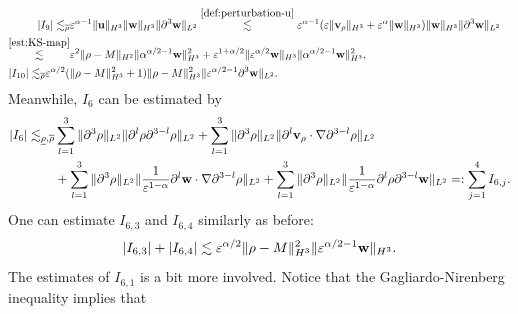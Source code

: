 \documentclass[11pt]{article}
\theoremstyle{plain}
\theoremstyle{definition}
\theoremstyle{remark}
\renewcommand{\vec}[1]{{\bf #1}}
\newcommand{\norm}[2]{\Vert #1 \Vert_{#2}}
\numberwithin{equation}{section}
\begin{document}
\begin{align}
\begin{aligned}
    \end{aligned}\\
    \label{est:101-05}
    & \begin{aligned}
        \vert I_9 \vert \lesssim_{\overline\rho} & \varepsilon^{\alpha-1}\norm{\vec u}{H^3} \norm{\vec w}{H^3} \norm{\partial^3 \vec w}{L^2} \stackrel{\eqref{def:perturbation-u}}{\lesssim} \varepsilon^{\alpha-1}(\varepsilon \norm{\vec v_\rho}{H^3} + \varepsilon^\alpha\norm{\vec w}{H^3} ) \norm{\vec w}{H^3} \norm{\partial^3 \vec w}{L^2} \\
        \stackrel{\eqref{est:KS-map}}{\lesssim} &  \varepsilon^{2} \norm{\rho-M}{H^2} \norm{\alpha^{\alpha/2 -1}\vec w}{H^3}^2 + \varepsilon^{1+\alpha/2} \norm{\varepsilon^{\alpha/2}\vec w}{H^3} \norm{\alpha^{\alpha/2 -1}\vec w}{H^3}^2,
    \end{aligned}\\
    \label{est:101-06}
    & \begin{aligned}
        \vert I_{10} \vert \lesssim_{\overline\rho} & \varepsilon^{\alpha/2} (\norm{\rho - M}{H^3}^2 + 1 ) \norm{\rho-M}{H^3}^2 \norm{\varepsilon^{\alpha/2-1}\partial^3 \vec w}{L^2}.
    \end{aligned}
\end{align}
Meanwhile, $ I_6 $ can be estimated by
\begin{equation}
    \label{est:101-07}
    \begin{aligned}
    \vert I_6 \vert \lesssim_{\underline\rho, \overline\rho} & \sum_{l=1}^3 \norm{\partial^3 \rho}{L^2} \norm{\partial^l \rho \partial^{3-l}\rho}{L^2} + \sum_{l=1}^3 \norm{\partial^3 \rho}{L^2} \norm{\partial^l \vec v_\rho \cdot \nabla \partial^{3-l}\rho}{L^2} \\
        & + \sum_{l=1}^3 \norm{\partial^3 \rho}{L^2} \norm{\frac{1}{\varepsilon^{1-\alpha}}\partial^l \vec w \cdot \nabla \partial^{3-l}\rho}{L^2} 
         + \sum_{l=1}^3 \norm{\partial^3 \rho}{L^2} \norm{ \frac{1}{\varepsilon^{1-\alpha}}\partial^l \rho \partial^{3-l} \vec w}{L^2} =: \sum_{j=1}^{4}I_{6,j}. 
    \end{aligned}
\end{equation}
One can estimate $ I_{6,3} $ and $ I_{6,4} $ similarly as before:
\begin{equation}
    \label{est:101-07-1}
    \vert I_{6,3} \vert + \vert I_{6,4} \vert \lesssim \varepsilon^{\alpha/2}\norm{\rho - M}{H^3}^2 \norm{\varepsilon^{\alpha/2-1}\vec w}{H^3}.
\end{equation}
The estimates of $ I_{6,1} $ is a bit more involved. Notice that the Gagliardo-Nirenberg inequality implies that
\end{document}

